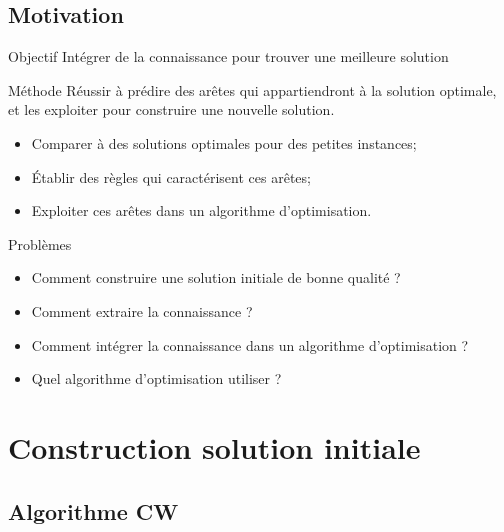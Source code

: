 \documentclass{beamer}
\begin{document}
\subsection{Motivation}

\begin{frame}
\begin{block}{Objectif}
Intégrer de la connaissance pour trouver une meilleure solution
\end{block}

\begin{exampleblock}{Méthode}
Réussir à prédire des arêtes qui appartiendront à la solution optimale, et les exploiter pour construire une nouvelle solution.
\begin{itemize}
\item Comparer à des solutions optimales pour des petites instances;
\item Établir des règles qui caractérisent ces arêtes;
\item Exploiter ces arêtes dans un algorithme d'optimisation.
\end{itemize}
\end{exampleblock}

\begin{alertblock}{Problèmes}
\begin{itemize}
\item Comment construire une solution initiale de bonne qualité ?
\item Comment extraire la connaissance ?
\item Comment intégrer la connaissance dans un algorithme d'optimisation ?
\item Quel algorithme d'optimisation utiliser ?
\end{itemize}
\end{alertblock}
\end{frame}

\section{Construction solution initiale}

\subsection{Algorithme CW}
\end{document}
